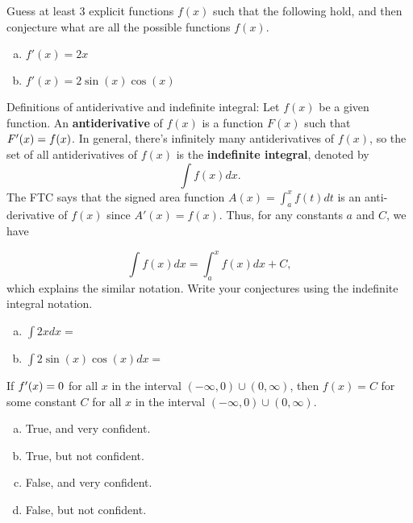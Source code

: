 \documentclass[answers]{exam}
\begin{document}
\begin{questions}


\question Guess at least 3 explicit functions $f(x)$ such that the following hold, and then conjecture what are all the possible functions $f(x)$.
\begin{enumerate}[(a)]
\item $f'(x) = 2x$ 

\hfill \break
\hfill \break
\hfill \break


\item $f'(x) = 2\sin(x)\cos(x)$

\hfill \break
\hfill \break
\hfill \break
\hfill \break
\hfill \break
\hfill \break
\hfill \break
\hfill \break
\hfill \break

\end{enumerate}

\question Definitions of antiderivative and indefinite integral: Let $f(x)$ be a given function. An \textbf{antiderivative} of $f(x)$ is a function $F(x)$ such that $F\rq{}(x) = f(x)$. In general, there\rq{}s infinitely many antiderivatives of $f(x)$, so the set of all antiderivatives of $f(x)$ is the \textbf{indefinite integral}, denoted by
\[\int f(x)dx.\] 
The FTC says that the signed area function $A(x) = \int_{a}^{x}f(t)dt$ is an anti-derivative of $f(x)$ since $A'(x) = f(x)$. Thus, for any constants $a$ and $C$, we have

\[\int f(x)dx = \int_a^x f(x)dx + C,\]
which explains the similar notation. Write your conjectures using the indefinite integral notation.
\begin{enumerate}[(a)]
	\item $\displaystyle \int 2x dx =$ 
	
	\hfill \break
	
	
	\item $\displaystyle \int 2\sin(x)\cos(x) dx = $
	
	
\end{enumerate}

\question If $f\rq{}(x) = 0$ for all $x$ in the interval $(-\infty, 0)\cup(0, \infty)$, then $f(x) = C$ for some constant $C$ for all $x$ in the interval $(-\infty, 0)\cup(0, \infty)$. 
\begin{enumerate}[(a)]
\item True, and very confident.
\item True, but not confident.
\item False, and very confident.
\item False, but not confident.
\end{enumerate}


\end{questions}
\end{document}
